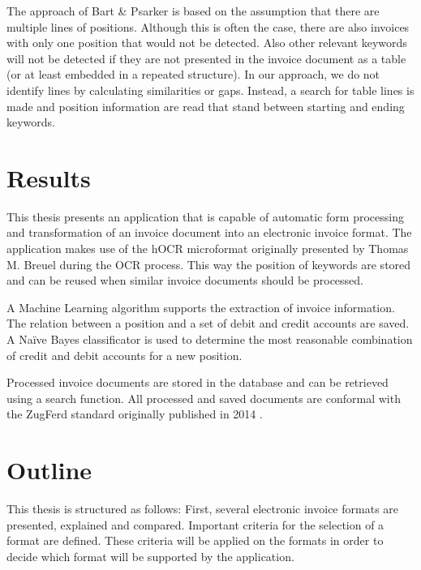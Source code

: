 The approach of Bart \& Psarker \cite{Bart10} is based on the assumption that there are multiple lines of positions. Although this is often the case, there are also invoices with only one position that would not be detected. Also other relevant keywords will not be detected if they are not presented in the invoice document as a table (or at least embedded in a repeated structure).
In our approach, we do not identify lines by calculating similarities or gaps. Instead, a search for table lines is made and position information are read that stand between starting and ending keywords.


\section{Results}
\label{sec1.5}
This thesis presents an application that is capable of automatic form processing and transformation of an invoice document into an electronic invoice format. The application makes use of the hOCR microformat originally presented by Thomas M. Breuel \cite{Breuel07} during the OCR process. This way the position of keywords are stored and can be reused when similar invoice documents should be processed.

A Machine Learning algorithm supports the extraction of invoice information. The relation between a position and a set of debit and credit accounts are saved. A Na{\"i}ve Bayes classificator is used to determine the most reasonable combination of credit and debit accounts for a new position.

Processed invoice documents are stored in the database and can be retrieved using a search function. All processed and saved documents are conformal with the ZugFerd standard originally published in 2014 \cite{Ferd14}.

\section{Outline}
\label{sec1.6}

This thesis is structured as follows: First, several electronic invoice formats are presented, explained and compared. Important criteria for the selection of a format are defined. These criteria will be applied on the formats in order to decide which format will be supported by the application.

